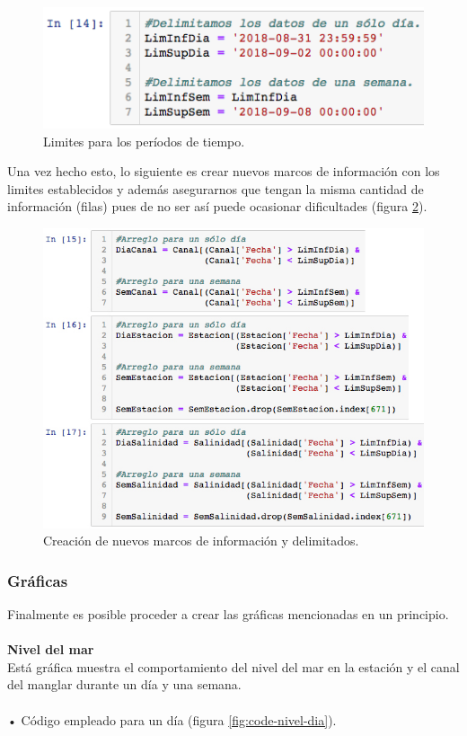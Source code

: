 \documentclass[12pt]{article}
\begin{document}
\begin{figure}[h!]
	\center
	\includegraphics[scale=.6]{./Images/limites}
	\caption{\label{fig:limites} Limites para los períodos de tiempo.}
\end{figure}

Una vez hecho esto, lo siguiente es crear nuevos marcos de información con los limites establecidos y además asegurarnos que tengan la misma cantidad de información (filas) pues de no ser así puede ocasionar dificultades (figura \ref{fig:diasem}).

\begin{figure}
	\center
	\includegraphics[scale=.6]{./Images/diasem}
	\caption{\label{fig:diasem} Creación de nuevos marcos de información y delimitados.}
\end{figure}

\subsubsection{Gráficas}

\noindent Finalmente es posible proceder a crear las gráficas mencionadas en un principio.\\
\\ 
\textbf{Nivel del mar} \\
Está gráfica muestra el comportamiento del nivel del mar en la estación y el canal del manglar durante un día y una semana. \\
\\
• Código empleado para un día (figura \ref{fig:code-nivel-dia}).
\end{document}

